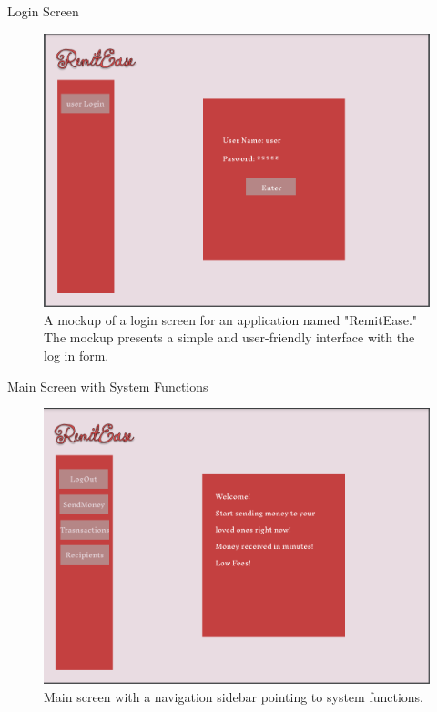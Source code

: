 \documentclass{beamer}
\begin{document}
\begin{frame}{Login Screen}
    \begin{figure}
        \centering
        \includegraphics[width=.7\linewidth]{MockUps/login.PNG}
        \caption{A mockup of a login screen for an application named "RemitEase." The mockup presents a simple and user-friendly interface with the log in form.}
        \label{fig:enter-label}
    \end{figure}
\end{frame}

\begin{frame}{Main Screen with System Functions}
    \begin{figure}
        \centering
        \includegraphics[width=.7\linewidth]{MockUps/2welcome.PNG}
        \caption{Main screen with a navigation sidebar pointing to system functions.}
        \label{fig:enter-label}
    \end{figure}
\end{frame}
\end{document}
